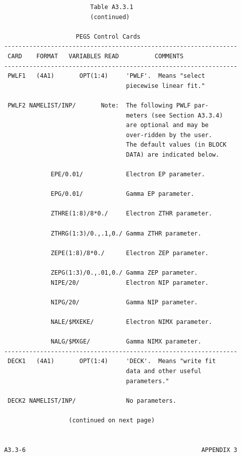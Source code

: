 \newpage {} \begin{verbatim}
                         Table A3.3.1
                         (continued)

                     PEGS Control Cards
 -----------------------------------------------------------------
  CARD    FORMAT   VARIABLES READ          COMMENTS
 -----------------------------------------------------------------
  PWLF1   (4A1)       OPT(1:4)     'PWLF'.  Means "select
                                   piecewise linear fit."

  PWLF2 NAMELIST/INP/       Note:  The following PWLF par-
                                   meters (see Section A3.3.4)
                                   are optional and may be
                                   over-ridden by the user.
                                   The default values (in BLOCK
                                   DATA) are indicated below.

              EPE/0.01/            Electron EP parameter.

              EPG/0.01/            Gamma EP parameter.

              ZTHRE(1:8)/8*0./     Electron ZTHR parameter.

              ZTHRG(1:3)/0.,.1,0./ Gamma ZTHR parameter.

              ZEPE(1:8)/8*0./      Electron ZEP parameter.

              ZEPG(1:3)/0.,.01,0./ Gamma ZEP parameter.
              NIPE/20/             Electron NIP parameter.

              NIPG/20/             Gamma NIP parameter.

              NALE/$MXEKE/         Electron NIMX parameter.

              NALG/$MXGE/          Gamma NIMX parameter.
 -----------------------------------------------------------------
  DECK1   (4A1)       OPT(1:4)     'DECK'.  Means "write fit
                                   data and other useful
                                   parameters."

  DECK2 NAMELIST/INP/              No parameters.

                   (continued on next page)


 A3.3-6                                                 APPENDIX 3
\end{verbatim}
